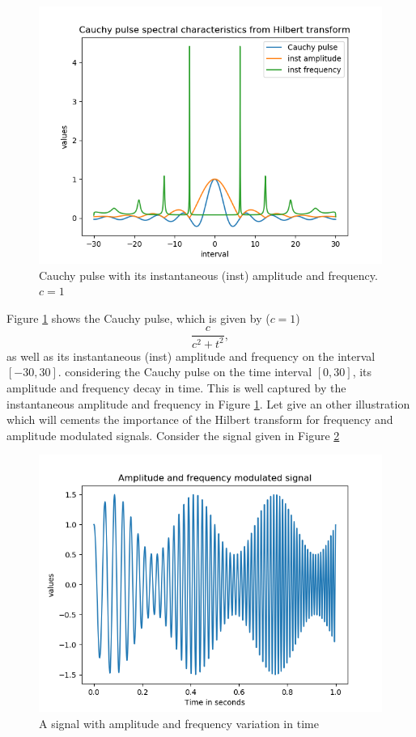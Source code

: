 \documentclass[../Main/thesis.tex]{subfiles}
\begin{document}
\begin{figure}[H]
	\centering
	\includegraphics[width=1\linewidth]{../fig/cauchy_pulse_spectral}
	\caption{Cauchy pulse with its instantaneous (inst) amplitude and frequency. $c=1$}
	\label{fig:cauchy_pulse}
\end{figure}
\justify
Figure \ref{fig:cauchy_pulse} shows the Cauchy pulse, which is given by ($c=1$)
\begin{equation}
	 \frac{c}{c^{2}+ t^{2}},
\end{equation}
as well as its instantaneous (inst) amplitude and frequency on the interval $[-30, 30]$. considering the Cauchy pulse on the time interval $[0,30]$, its amplitude and frequency decay in time. This is well captured by the instantaneous amplitude and frequency in Figure \ref{fig:cauchy_pulse}.
\justify
Let give an other illustration which will cements the importance of the Hilbert transform for frequency and amplitude modulated signals. Consider the signal given in Figure \ref{fig:mode}
\begin{figure}[H]
	\centering
	\includegraphics[width=1\linewidth]{../fig/mode}
	\caption{A signal with amplitude and frequency variation in time}
	\label{fig:mode}
\end{figure}
\end{document}
